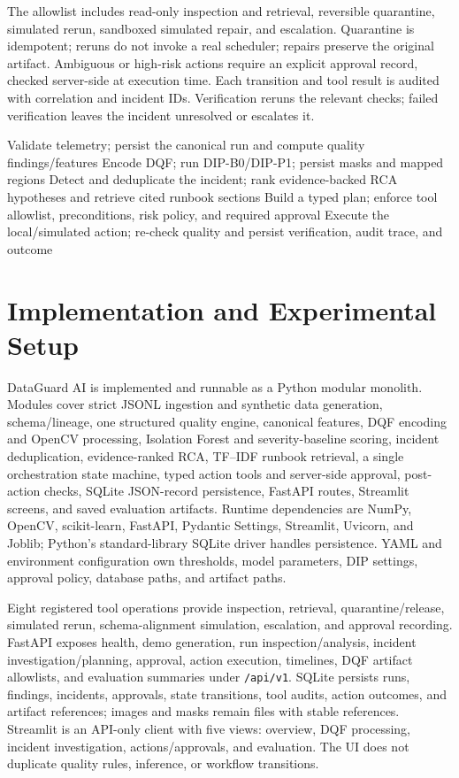 \documentclass[conference]{IEEEtran}
\begin{document}
The allowlist includes read-only inspection and retrieval, reversible quarantine, simulated rerun, sandboxed simulated repair, and escalation. Quarantine is idempotent; reruns do not invoke a real scheduler; repairs preserve the original artifact. Ambiguous or high-risk actions require an explicit approval record, checked server-side at execution time. Each transition and tool result is audited with correlation and incident IDs. Verification reruns the relevant checks; failed verification leaves the incident unresolved or escalates it.

\begin{algorithmic}[1]
\STATE Validate telemetry; persist the canonical run and compute quality findings/features
\STATE Encode DQF; run DIP-B0/DIP-P1; persist masks and mapped regions
\STATE Detect and deduplicate the incident; rank evidence-backed RCA hypotheses and retrieve cited runbook sections
\STATE Build a typed plan; enforce tool allowlist, preconditions, risk policy, and required approval
\STATE Execute the local/simulated action; re-check quality and persist verification, audit trace, and outcome
\end{algorithmic}

\section{Implementation and Experimental Setup}
DataGuard AI is implemented and runnable as a Python modular monolith. Modules cover strict JSONL ingestion and synthetic data generation, schema/lineage, one structured quality engine, canonical features, DQF encoding and OpenCV processing, Isolation Forest and severity-baseline scoring, incident deduplication, evidence-ranked RCA, TF--IDF runbook retrieval, a single orchestration state machine, typed action tools and server-side approval, post-action checks, SQLite JSON-record persistence, FastAPI routes, Streamlit screens, and saved evaluation artifacts. Runtime dependencies are NumPy, OpenCV, scikit-learn, FastAPI, Pydantic Settings, Streamlit, Uvicorn, and Joblib; Python's standard-library SQLite driver handles persistence. YAML and environment configuration own thresholds, model parameters, DIP settings, approval policy, database paths, and artifact paths.

Eight registered tool operations provide inspection, retrieval, quarantine/release, simulated rerun, schema-alignment simulation, escalation, and approval recording. FastAPI exposes health, demo generation, run inspection/analysis, incident investigation/planning, approval, action execution, timelines, DQF artifact allowlists, and evaluation summaries under \texttt{/api/v1}. SQLite persists runs, findings, incidents, approvals, state transitions, tool audits, action outcomes, and artifact references; images and masks remain files with stable references. Streamlit is an API-only client with five views: overview, DQF processing, incident investigation, actions/approvals, and evaluation. The UI does not duplicate quality rules, inference, or workflow transitions.
\end{document}

